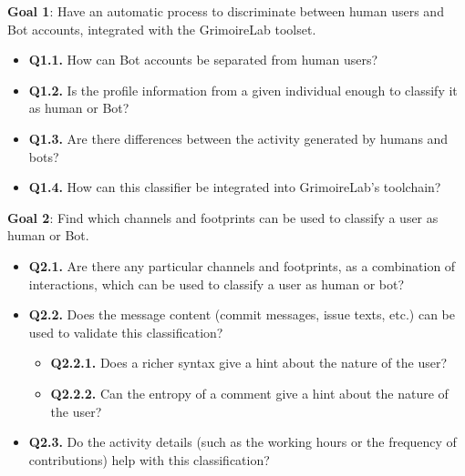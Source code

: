\documentclass[a4paper, 12pt]{book}
\begin{document}

\textbf{Goal 1}: Have an automatic process to discriminate between human users and Bot accounts, integrated with the GrimoireLab toolset.

\begin{itemize}
    \item \textbf{Q1.1.} How can Bot accounts be separated from human users?
    \item \textbf{Q1.2.} Is the profile information from a given individual enough to classify it as human or Bot?
    \item \textbf{Q1.3.} Are there differences between the activity generated by humans and bots?
    \item \textbf{Q1.4.} How can this classifier be integrated into GrimoireLab’s toolchain?
\end{itemize}

\textbf{Goal 2}: Find which channels and footprints can be used to classify a user as human or Bot.

\begin{itemize}
    \item \textbf{Q2.1.} Are there any particular channels and footprints, as a combination of interactions, which can be used to classify a user as human or bot?
    \item \textbf{Q2.2.} Does the message content (commit messages, issue texts, etc.) can be used to validate this classification?
    \begin{itemize}
        \item \textbf{Q2.2.1.} Does a richer syntax give a hint about the nature of the user? 
        \item \textbf{Q2.2.2.} Can the entropy of a comment give a hint about the nature of the user?
    \end{itemize}
    \item \textbf{Q2.3.} Do the activity details (such as the working hours or the frequency of contributions) help with this classification?

\end{itemize}
\end{document}
